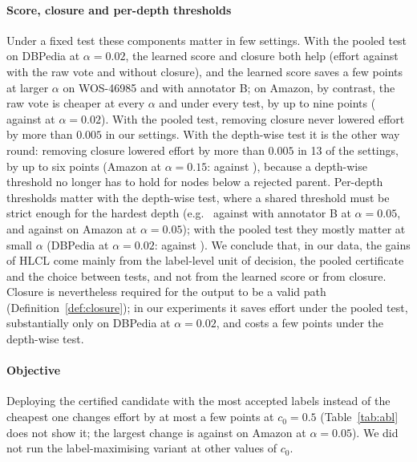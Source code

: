 \documentclass[preprint,12pt]{elsarticle}
\theoremstyle{definition}
\theoremstyle{remark}
\newcommand{\hlcl}{\textup{\textsc{HLCL}}}
\begin{document}
\paragraph{Score, closure and per-depth thresholds}
Under a fixed test these components matter in few settings. With the pooled
test on DBPedia at $\alpha=0.02$, the learned score and closure both help
(effort  against
 with the raw vote and
 without closure), and the learned
score saves a few points at larger $\alpha$ on WOS-46985 and with annotator B;
on Amazon, by contrast, the raw vote is cheaper at every $\alpha$ and under
every test, by up to nine points (
against  at $\alpha=0.02$). With the pooled
test, removing closure never lowered effort by more than $0.005$ in our
 settings. With the depth-wise test it is the other way round:
removing closure lowered effort by more than $0.005$ in 13 of the
 settings, by up to six points (Amazon at $\alpha=0.15$:
 against
), because a depth-wise threshold no longer
has to hold for nodes below a rejected parent. Per-depth thresholds matter with
the depth-wise test, where a shared threshold must be strict enough for the
hardest depth (e.g.\  against
 with annotator B at $\alpha=0.05$, and
 against
 on Amazon at $\alpha=0.05$); with the
pooled test they mostly matter at small $\alpha$ (DBPedia at $\alpha=0.02$:
 against
). We conclude that, in our data, the
gains of \hlcl{} come mainly from the label-level unit of decision, the pooled
certificate and the choice between tests, and not from the learned score or
from closure. Closure is nevertheless required for the output to be a valid path
(Definition~\ref{def:closure}); in our experiments it saves effort under the
pooled test, substantially only on DBPedia at $\alpha=0.02$, and costs a few
points under the depth-wise test.

\paragraph{Objective}
Deploying the certified candidate with the most accepted labels instead of the
cheapest one changes effort by at most a few points at $c_0=0.5$
(Table~\ref{tab:abl} does not show it; the largest change is
 against 
on Amazon at $\alpha=0.05$). We did not run the label-maximising variant at
other values of $c_0$.
\end{document}
